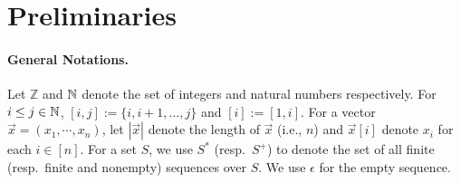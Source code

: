 
\section{Preliminaries}
\label{sec:prelim}

\paragraph{General Notations.}
Let $\mathbb{Z}$ and $\mathbb{N}$ denote the set of integers and natural numbers
respectively. For $i \le j \in \mathbb{N}$, $[i, j]:=\{i,i+1,\ldots,j\}$ and
$[i] := [1, i]$. 
For a vector
$\vec{x}=(x_1,\cdots, x_n)$, let $|\vec{x}|$ denote the length of $\vec{x}$
(i.e., $n$) and  $\vec{x}[i]$ denote $x_i$ for each $i \in [n]$. For a set
$S$, we use $S^*$ (resp.~$S^+$) to denote the set of all finite (resp.~finite
and nonempty) sequences over $S$. We use $\epsilon$ for the empty sequence.

